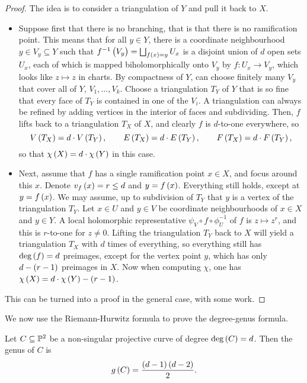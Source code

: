 \begin{proof}
The idea is to consider a triangulation of $ Y $ and pull it back to $ X $.
\begin{itemize}
\item Suppose first that there is no branching, that is that there is no ramification point. This means that for all $ y \in Y $, there is a coordinate neighbourhood $ y \in V_y \subseteq Y $ such that $ f^{-1}\br{V_y} = \bigsqcup_{f\br{x} = y} U_x $ is a disjoint union of $ d $ open sets $ U_x $, each of which is mapped biholomorphically onto $ V_y $ by $ f : U_x \to V_y $, which looks like $ z \mapsto z $ in charts. By compactness of $ Y $, can choose finitely many $ V_y $ that cover all of $ Y $, $ V_1, \dots, V_k $. Choose a triangulation $ T_Y $ of $ Y $ that is so fine that every face of $ T_Y $ is contained in one of the $ V_i $. A triangulation can always be refined by adding vertices in the interior of faces and subdividing. Then, $ f $ lifts back to a triangulation $ T_X $ of $ X $, and clearly $ f $ is $ d $-to-one everywhere, so
$$ V\br{T_X} = d \cdot V\br{T_Y}, \qquad E\br{T_X} = d \cdot E\br{T_Y}, \qquad F\br{T_X} = d \cdot F\br{T_Y}, $$
so that $ \chi\br{X} = d \cdot \chi\br{Y} $ in this case.
\item Next, assume that $ f $ has a single ramification point $ x \in X $, and focus around this $ x $. Denote $ v_f\br{x} = r \le d $ and $ y = f\br{x} $. Everything still holds, except at $ y = f\br{x} $. We may assume, up to subdivision of $ T_Y $ that $ y $ is a vertex of the triangulation $ T_Y $. Let $ x \in U $ and $ y \in V $ be coordinate neighbourhoods of $ x \in X $ and $ y \in Y $. A local holomorphic representative $ \psi_V \circ f \circ \phi_U^{-1} $ of $ f $ is $ z \mapsto z^r $, and this is $ r $-to-one for $ z \ne 0 $. Lifting the triangulation $ T_Y $ back to $ X $ will yield a triangulation $ T_X $ with $ d $ times of everything, so everything still has $ \deg\br{f} = d $ preimages, except for the vertex point $ y $, which has only $ d - \br{r - 1} $ preimages in $ X $. Now when computing $ \chi $, one has $ \chi\br{X} = d \cdot \chi\br{Y} - \br{r - 1} $.
\end{itemize}
This can be turned into a proof in the general case, with some work.
\end{proof}

We now use the Riemann-Hurwitz formula to prove the degree-genus formula.

\begin{theorem}
Let $ C \subseteq \P^2 $ be a non-singular projective curve of degree $ \deg\br{C} = d $. Then the genus of $ C $ is
$$ g\br{C} = \dfrac{\br{d - 1}\br{d - 2}}{2}. $$
\end{theorem}

